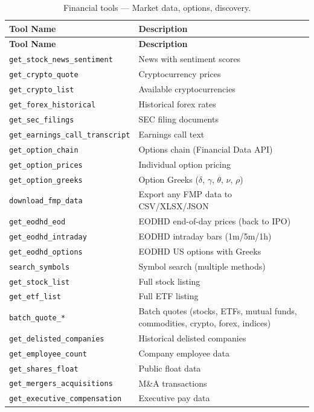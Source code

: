 \begin{longtable}{p{5cm}p{8cm}}
\caption{Financial tools --- Market data, options, discovery.} \label{tab:tools-fin-market} \\
\toprule
\textbf{Tool Name} & \textbf{Description} \\
\midrule
\endfirsthead
\toprule
\textbf{Tool Name} & \textbf{Description} \\
\midrule
\endhead
\texttt{get\_stock\_news\_sentiment} & News with sentiment scores \\
\texttt{get\_crypto\_quote} & Cryptocurrency prices \\
\texttt{get\_crypto\_list} & Available cryptocurrencies \\
\texttt{get\_forex\_historical} & Historical forex rates \\
\texttt{get\_sec\_filings} & SEC filing documents \\
\texttt{get\_earnings\_call\_transcript} & Earnings call text \\
\texttt{get\_option\_chain} & Options chain (Financial Data API) \\
\texttt{get\_option\_prices} & Individual option pricing \\
\texttt{get\_option\_greeks} & Option Greeks ($\delta$, $\gamma$, $\theta$, $\nu$, $\rho$) \\
\texttt{download\_fmp\_data} & Export any FMP data to CSV/XLSX/JSON \\
\texttt{get\_eodhd\_eod} & EODHD end-of-day prices (back to IPO) \\
\texttt{get\_eodhd\_intraday} & EODHD intraday bars (1m/5m/1h) \\
\texttt{get\_eodhd\_options} & EODHD US options with Greeks \\
\texttt{search\_symbols} & Symbol search (multiple methods) \\
\texttt{get\_stock\_list} & Full stock listing \\
\texttt{get\_etf\_list} & Full ETF listing \\
\texttt{batch\_quote\_*} & Batch quotes (stocks, ETFs, mutual funds, commodities, crypto, forex, indices) \\
\texttt{get\_delisted\_companies} & Historical delisted companies \\
\texttt{get\_employee\_count} & Company employee data \\
\texttt{get\_shares\_float} & Public float data \\
\texttt{get\_mergers\_acquisitions} & M\&A transactions \\
\texttt{get\_executive\_compensation} & Executive pay data \\
\bottomrule
\end{longtable}

